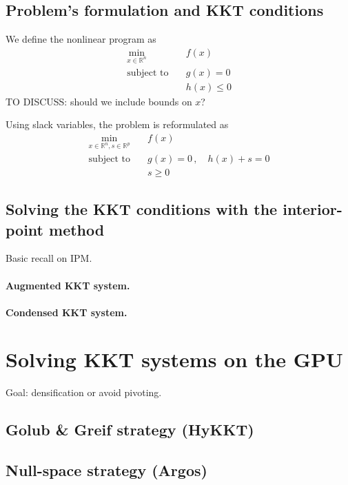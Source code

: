 \documentclass{article}
\theoremstyle{definition}
\theoremstyle{remark}
\begin{document}
\subsection{Problem's formulation and KKT conditions}
We define the nonlinear program as
\begin{equation}
  \begin{aligned}
    \min_{x \in \mathbb{R}^n} \; & f(x) \\
    \text{subject to} \quad & g(x) = 0 \\
                            & h(x) \leq 0
  \end{aligned}
\end{equation}
TO DISCUSS: should we include bounds on $x$?

Using slack variables, the problem is reformulated as
\begin{equation}
  \begin{aligned}
    \min_{x \in \mathbb{R}^n, s \in \mathbb{R}^p} \; & f(x) \\
    \text{subject to} \quad & g(x) = 0 \, , \quad h(x) + s = 0  \\
                            & s \geq 0
  \end{aligned}
\end{equation}


\subsection{Solving the KKT conditions with the interior-point method}
Basic recall on IPM.

\paragraph{Augmented KKT system.}

\paragraph{Condensed KKT system.}



\section{Solving KKT systems on the GPU}
Goal: densification or avoid pivoting.
\subsection{Golub \& Greif strategy (HyKKT)}
\subsection{Null-space strategy (Argos)}
\end{document}
